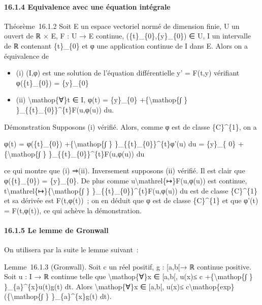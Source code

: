 \documentclass[]{article}
\begin{document}
\paragraph{16.1.4 Equivalence avec une équation intégrale}

Théorème~16.1.2 Soit E un espace vectoriel normé de dimension finie, U
un ouvert de ℝ × E, F : U → E continue, (\{t\}\_\{0\},\{y\}\_\{0\}) ∈ U,
I un intervalle de ℝ contenant \{t\}\_\{0\} et φ une application
continue de I dans E. Alors on a équivalence de

\begin{itemize}
\itemsep1pt\parskip0pt
\item
  (i) (I,φ) est une solution de l'équation différentielle y' = F(t,y)
  vérifiant φ(\{t\}\_\{0\}) = \{y\}\_\{0\}
\item
  (ii) \textbackslash{}mathop\{∀\}t ∈ I, φ(t) = \{y\}\_\{0\}
  +\{\textbackslash{}mathop\{∫ \} \}\_\{\{t\}\_\{0\}\}\^{}\{t\}F(u,φ(u))
  du.
\end{itemize}

Démonstration Supposons (i) vérifié. Alors, comme φ est de classe
\{C\}\^{}\{1\}, on a

φ(t) = φ(\{t\}\_\{0\}) +\{\textbackslash{}mathop\{∫ \}
\}\_\{\{t\}\_\{0\}\}\^{}\{t\}φ'(u) du = \{y\}\_\{ 0\}
+\{\textbackslash{}mathop\{∫ \} \}\_\{\{t\}\_\{0\}\}\^{}\{t\}F(u,φ(u))
du

ce qui montre que (i) ⇒(ii). Inversement supposons (ii) vérifié. Il est
clair que φ(\{t\}\_\{0\}) = \{y\}\_\{0\}. De plus comme
u\textbackslash{}mathrel\{↦\}F(u,φ(u)) est continue,
t\textbackslash{}mathrel\{↦\}\{\textbackslash{}mathop\{∫ \}
\}\_\{\{t\}\_\{0\}\}\^{}\{t\}F(u,φ(u)) du est de classe \{C\}\^{}\{1\}
et sa dérivée est F(t,φ(t))~; on en déduit que φ est de classe
\{C\}\^{}\{1\} et que φ'(t) = F(t,φ(t)), ce qui achève la démonstration.

\paragraph{16.1.5 Le lemme de Gronwall}

On utilisera par la suite le lemme suivant~:

Lemme~16.1.3 (Gronwall). Soit c un réel positif, g : {[}a,b{[}→ ℝ
continue positive. Soit u : I → ℝ continue telle que
\textbackslash{}mathop\{∀\}x ∈ {[}a,b{[}, \textbar{}u(x)\textbar{}≤ c
+\{\textbackslash{}mathop\{∫ \}
\}\_\{a\}\^{}\{x\}\textbar{}u(t)\textbar{}g(t) dt. Alors
\textbackslash{}mathop\{∀\}x ∈ {[}a,b{[}, \textbar{}u(x)\textbar{}≤
c\textbackslash{}mathop\{exp\} (\{\textbackslash{}mathop\{∫ \}
\}\_\{a\}\^{}\{x\}g(t) dt).
\end{document}
